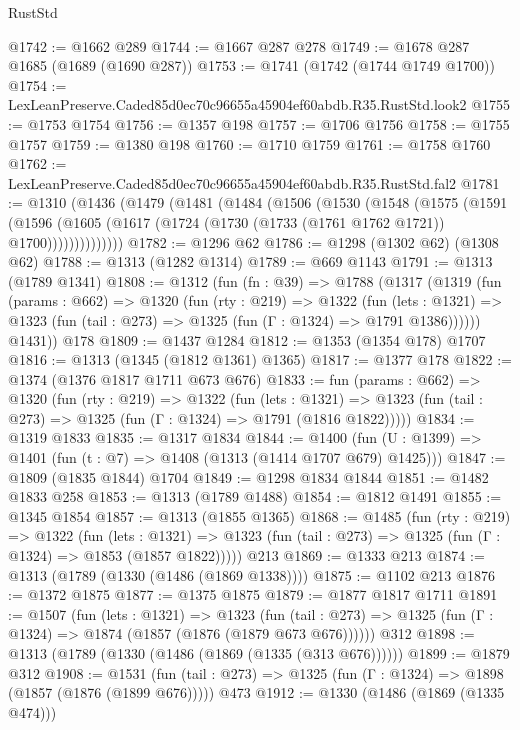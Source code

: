 \begin{lexlean}{RustStd}
\begin{coremodule}
@1742 := @1662 @289
@1744 := @1667 @287 @278
@1749 := @1678 @287 @1685 (@1689 (@1690 @287))
@1753 := @1741 (@1742 (@1744 @1749 @1700))
@1754 := LexLeanPreserve.Caded85d0ec70c96655a45904ef60abdb.R35.RustStd.look2
@1755 := @1753 @1754
@1756 := @1357 @198
@1757 := @1706 @1756
@1758 := @1755 @1757
@1759 := @1380 @198
@1760 := @1710 @1759
@1761 := @1758 @1760
@1762 := LexLeanPreserve.Caded85d0ec70c96655a45904ef60abdb.R35.RustStd.fal2
@1781 := @1310
    (@1436
      (@1479
        (@1481
          (@1484
            (@1506
              (@1530
                (@1548
                  (@1575
                    (@1591
                      (@1596
                        (@1605 (@1617 (@1724 (@1730 (@1733 (@1761 @1762 @1721)) @1700))))))))))))))
@1782 := @1296 @62
@1786 := @1298 (@1302 @62) (@1308 @62)
@1788 := @1313 (@1282 @1314)
@1789 := @669 @1143
@1791 := @1313 (@1789 @1341)
@1808 := @1312
    (fun (fn : @39) =>
    @1788
      (@1317
        (@1319
          (fun (params : @662) =>
          @1320
            (fun (rty : @219) =>
            @1322
              (fun (lets : @1321) =>
              @1323 (fun (tail : @273) => @1325 (fun (Γ : @1324) => @1791 @1386))))))
        @1431))
    @178
@1809 := @1437 @1284
@1812 := @1353 (@1354 @178) @1707
@1816 := @1313 (@1345 (@1812 @1361) @1365)
@1817 := @1377 @178
@1822 := @1374 (@1376 @1817 @1711 @673 @676)
@1833 := fun (params : @662) =>
  @1320
    (fun (rty : @219) =>
    @1322
      (fun (lets : @1321) =>
      @1323 (fun (tail : @273) => @1325 (fun (Γ : @1324) => @1791 (@1816 @1822)))))
@1834 := @1319 @1833
@1835 := @1317 @1834
@1844 := @1400 (fun (U : @1399) => @1401 (fun (t : @7) => @1408 (@1313 (@1414 @1707 @679) @1425)))
@1847 := @1809 (@1835 @1844) @1704
@1849 := @1298 @1834 @1844
@1851 := @1482 @1833 @258
@1853 := @1313 (@1789 @1488)
@1854 := @1812 @1491
@1855 := @1345 @1854
@1857 := @1313 (@1855 @1365)
@1868 := @1485
    (fun (rty : @219) =>
    @1322
      (fun (lets : @1321) =>
      @1323 (fun (tail : @273) => @1325 (fun (Γ : @1324) => @1853 (@1857 @1822)))))
    @213
@1869 := @1333 @213
@1874 := @1313 (@1789 (@1330 (@1486 (@1869 @1338))))
@1875 := @1102 @213
@1876 := @1372 @1875
@1877 := @1375 @1875
@1879 := @1877 @1817 @1711
@1891 := @1507
    (fun (lets : @1321) =>
    @1323 (fun (tail : @273) => @1325 (fun (Γ : @1324) => @1874 (@1857 (@1876 (@1879 @673 @676))))))
    @312
@1898 := @1313 (@1789 (@1330 (@1486 (@1869 (@1335 (@313 @676))))))
@1899 := @1879 @312
@1908 := @1531
    (fun (tail : @273) => @1325 (fun (Γ : @1324) => @1898 (@1857 (@1876 (@1899 @676)))))
    @473
@1912 := @1330 (@1486 (@1869 (@1335 @474)))

\end{coremodule}
\end{lexlean}
